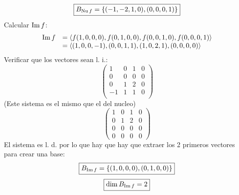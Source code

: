\documentclass[../practica.root.tex]{subfiles}
\begin{document}
\begin{enumerate}
\begin{enumerate}
\[                    \] \[
                        \boxed{B_{\operatorname{Nu} f} = \{ (-1,-2,1,0),(0,0,0,1) \}}
                    \]
                    Calcular $ \operatorname{Im} f $:
                    \[
                        \begin{array}{rl}
                            \operatorname{Im} f & = \langle f(1,0,0,0),f(0,1,0,0),f(0,0,1,0),f(0,0,0,1) \rangle \\
                                   & = \langle (1,0,0,-1),(0,0,1,1),(1,0,2,1),(0,0,0,0) \rangle
                        \end{array}
                    \]
                    Verificar que los vectores sean l. i.:
                    \[
                        \begin{pmatrix}
                            1  & 0 & 1 & 0 \\
                            0  & 0 & 0 & 0 \\
                            0  & 1 & 2 & 0 \\
                            -1 & 1 & 1 & 0 \\
                        \end{pmatrix}
                    \]
                    (Este sistema es el mismo que el del nucleo)
                    \[
                        \begin{pmatrix}
                            1 & 0 & 1 & 0 \\
                            0 & 1 & 2 & 0 \\
                            0 & 0 & 0 & 0 \\
                            0 & 0 & 0 & 0
                        \end{pmatrix}
                    \]
                    El sistema es l. d. por lo que hay que hay que extraer los 2 primeros vectores para crear una base:
                    \[ \boxed{B_{\operatorname{Im} f} = \{ (1,0,0,0),(0,1,0,0) \}} \]
                    \[ \boxed{\dim B_{\operatorname{Im} f} = 2} \]


\end{enumerate}
\end{enumerate}
\end{document}
